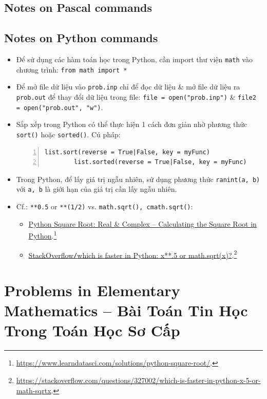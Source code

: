 \documentclass{article}
\begin{document}
\subsection{Notes on Pascal commands}

\subsection{Notes on Python commands}

\begin{itemize}
	\item Để sử dụng các hàm toán học trong Python, cần import thư viện {\tt math} vào chương trình: {\tt from math import *}
	\item Để mở file dữ liệu vào {\tt prob.inp} chỉ để đọc dữ liệu \& mở file dữ liệu ra {\tt prob.out} để thay đổi dữ liệu trong file: {\tt file = open("prob.inp")} \& {\tt file2 = open("prob.out", "w")}.
	\item Sắp xếp trong Python có thể thực hiện 1 cách đơn giản nhờ phương thức {\tt sort()} hoặc {\tt sorted()}. Cú pháp:
	\begin{Verbatim}[numbers=left,xleftmargin=5mm]
		list.sort(reverse = True|False, key = myFunc)
		list.sorted(reverse = True|False, key = myFunc)
	\end{Verbatim}
	\item Trong Python, để lấy giá trị ngẫu nhiên, sử dụng phương thức {\tt ranint(a, b)} với {\tt a, b} là giới hạn của giá trị cần lấy ngẫu nhiên.
	\item Cf.: \texttt{**0.5} or \texttt{**(1/2)} vs. \texttt{math.sqrt(), cmath.sqrt()}:
	\begin{itemize}
		\item \href{https://www.learndatasci.com/solutions/python-square-root/}{Python Square Root: Real \& Complex -- Calculating the Square Root in Python}.\footnote{\url{https://www.learndatasci.com/solutions/python-square-root/}.}
		\item \href{https://stackoverflow.com/questions/327002/which-is-faster-in-python-x-5-or-math-sqrtx}{StackOverflow{\tt/}which is faster in Python: x**.5 or math.sqrt(x)?}.\footnote{\url{https://stackoverflow.com/questions/327002/which-is-faster-in-python-x-5-or-math-sqrtx}.}
	\end{itemize}
\end{itemize}


\section{Problems in Elementary Mathematics  -- Bài Toán Tin Học Trong Toán Học Sơ Cấp}
\end{document}
